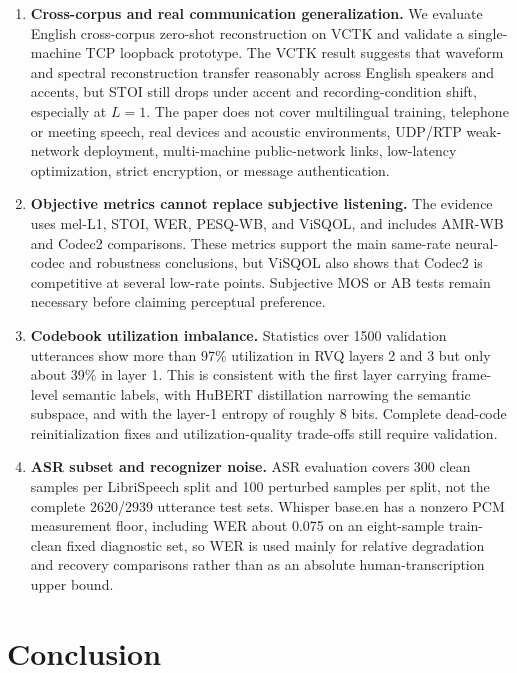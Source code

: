 \documentclass[10pt,twocolumn]{article}
\begin{document}
\begin{enumerate}[leftmargin=*,topsep=2pt,itemsep=2pt]
  \item \textbf{Cross-corpus and real communication generalization.} We evaluate English cross-corpus zero-shot reconstruction on VCTK and validate a single-machine TCP loopback prototype. The VCTK result suggests that waveform and spectral reconstruction transfer reasonably across English speakers and accents, but STOI still drops under accent and recording-condition shift, especially at \(L=1\). The paper does not cover multilingual training, telephone or meeting speech, real devices and acoustic environments, UDP/RTP weak-network deployment, multi-machine public-network links, low-latency optimization, strict encryption, or message authentication.
  \item \textbf{Objective metrics cannot replace subjective listening.} The evidence uses mel-L1, STOI, WER, PESQ-WB, and ViSQOL, and includes AMR-WB and Codec2 comparisons. These metrics support the main same-rate neural-codec and robustness conclusions, but ViSQOL also shows that Codec2 is competitive at several low-rate points. Subjective MOS or AB tests remain necessary before claiming perceptual preference.
  \item \textbf{Codebook utilization imbalance.} Statistics over 1500 validation utterances show more than 97\% utilization in RVQ layers 2 and 3 but only about 39\% in layer 1. This is consistent with the first layer carrying frame-level semantic labels, with HuBERT distillation narrowing the semantic subspace, and with the layer-1 entropy of roughly 8 bits. Complete dead-code reinitialization fixes and utilization-quality trade-offs still require validation.
  \item \textbf{ASR subset and recognizer noise.} ASR evaluation covers 300 clean samples per LibriSpeech split and 100 perturbed samples per split, not the complete 2620/2939 utterance test sets. Whisper base.en has a nonzero PCM measurement floor, including WER about 0.075 on an eight-sample train-clean fixed diagnostic set, so WER is used mainly for relative degradation and recovery comparisons rather than as an absolute human-transcription upper bound.
\end{enumerate}

\section{Conclusion}
\end{document}
